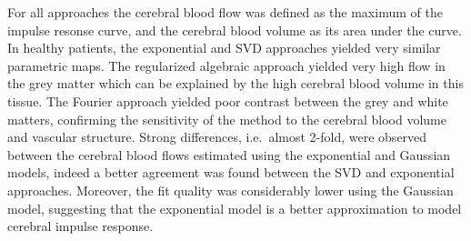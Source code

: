 For all approaches the cerebral blood flow was defined as the maximum of the impulse resonse curve, and the cerebral blood volume as its area under the curve.
In healthy patients, the exponential and SVD approaches yielded very similar parametric maps.
The regularized algebraic approach yielded very high flow in the grey matter which can be explained by the high cerebral blood volume in this tissue.
The Fourier approach yielded poor contrast between the grey and white matters, confirming the sensitivity of the method to the cerebral blood volume and vascular structure.
Strong differences, i.e.~almost 2-fold, were observed between the cerebral blood flows estimated using the exponential and Gaussian models, indeed a better agreement was found between the SVD and exponential approaches.
Moreover, the fit quality was considerably lower using the Gaussian model, suggesting that the exponential model is a better approximation to model cerebral impulse response.

